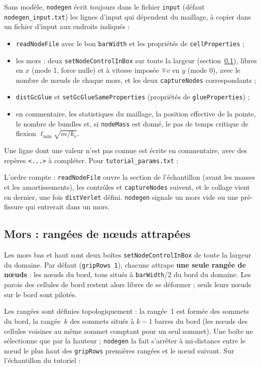 \documentclass[11pt,a4paper]{article}
\newcommand{\code}[1]{\texttt{#1}}
\newcommand{\toolgen}{\code{nodegen}}
\begin{document}
Sans modèle, \toolgen{} écrit toujours dans le fichier \code{input} (défaut \code{nodegen\_input.txt}) les
lignes d'input qui dépendent du maillage, à copier dans un fichier d'input aux endroits indiqués :
\begin{itemize}[nosep]
  \item \code{readNodeFile} avec le bon \code{barWidth} et les propriétés de \code{cellProperties} ;
  \item les mors : deux \code{setNodeControlInBox} sur toute la largeur (section~\ref{sec:grips}), libres en $x$
    (mode 1, force nulle) et à vitesse imposée $\mp v$ en $y$ (mode 0), avec le nombre de nœuds de chaque mors,
    et les deux \code{captureNodes} correspondants ;
  \item \code{distGcGlue} et \code{setGcGlueSameProperties} (propriétés de \code{glueProperties}) ;
  \item en commentaire, les statistiques du maillage, la position effective de la pointe, le nombre de bundles et,
    si \code{nodeMass} est donné, le pas de temps critique de flexion $\ell_{\min}\sqrt{m/k_r}$.
\end{itemize}
Une ligne dont une valeur n'est pas connue est écrite en commentaire, avec des repères \code{<...>} à compléter.
Pour \code{tutorial\_params.txt} :



L'ordre compte : \code{readNodeFile} ouvre la section de l'échantillon (avant les masses et les amortissements),
les contrôles et \code{captureNodes} suivent, et le collage vient en dernier, une fois \code{distVerlet} défini.
\toolgen{} signale un mors vide ou une pré-fissure qui entrerait dans un mors.

\subsection{Mors : rangées de nœuds attrapées}
\label{sec:grips}

Les mors bas et haut sont deux boîtes \code{setNodeControlInBox} de toute la largeur du domaine. Par défaut
(\code{gripRows 1}), chacune attrape \textbf{une seule rangée de nœuds} : les nœuds du bord, tous situés à
\code{barWidth}/2 du bord du domaine. Les parois des cellules de bord restent alors libres de se déformer ; seuls
leurs nœuds sur le bord sont pilotés.

Les rangées sont définies topologiquement : la rangée~1 est formée des sommets du bord, la rangée~$k$ des sommets
situés à $k-1$ barres du bord (les nœuds des cellules voisines au même sommet comptant pour un seul sommet). Une
boîte ne sélectionne que par la hauteur ; \toolgen{} la fait s'arrêter à mi-distance entre le nœud le plus haut
des \code{gripRows} premières rangées et le nœud suivant. Sur l'échantillon du tutoriel :
\end{document}

